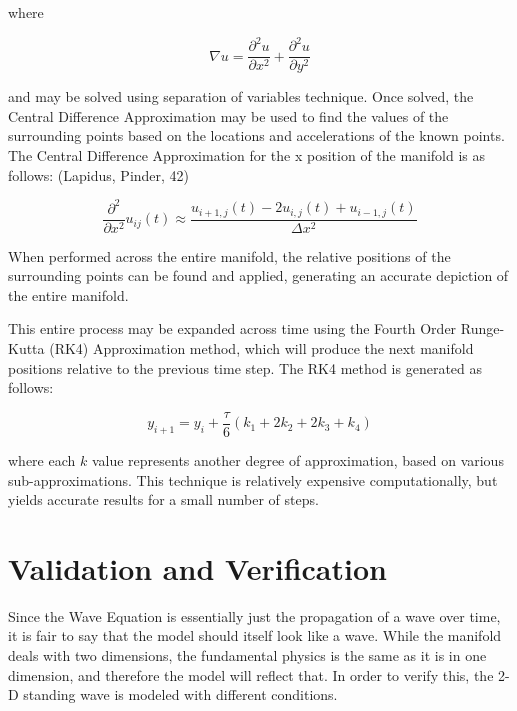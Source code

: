 \documentclass{article}
\begin{document}
\begin{multicols}{2}
where

\begin{equation}
    \label{equation3}
    \nabla u = \frac{\partial^2u}{\partial x^2} + \frac{\partial^2u}{\partial y^2}
\end{equation}

and may be solved using separation of variables technique. Once solved, the Central Difference Approximation may be used to find the values of the surrounding points based on the locations and accelerations of the known points. The Central Difference Approximation for the x position of the manifold is as follows: (Lapidus, Pinder, 42)

\begin{equation}
    \label{equation4}
    \frac{\partial^2}{\partial x^2}u_{ij}(t) \approx \frac{u_{i+1, j}(t) - 2u_{i, j}(t) + u_{i-1, j}(t)}{\Delta x^2}
\end{equation}

When performed across the entire manifold, the relative positions of the surrounding points can be found and applied, generating an accurate depiction of the entire manifold. 

This entire process may be expanded across time using the Fourth Order Runge-Kutta (RK4) Approximation method, which will produce the next manifold positions relative to the previous time step. The RK4 method is generated as follows:

\begin{equation}
    \label{equation5}
    y_{i+1} = y_i+\frac{\tau}{6}\left(k_1+2k_2+2k_3+k_4\right)
\end{equation}

where each $k$ value represents another degree of approximation, based on various sub-approximations. This technique is relatively expensive computationally, but yields accurate results for a small number of steps.


\section{Validation and Verification}

Since the Wave Equation is essentially just the propagation of a wave over time, it is fair to say that the model should itself look like a wave. While the manifold deals with two dimensions, the fundamental physics is the same as it is in one dimension, and therefore the model will reflect that. In order to verify this, the 2-D standing wave is modeled with different conditions.


\end{multicols}
\end{document}
